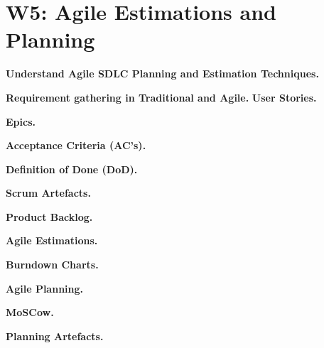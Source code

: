 \section{W5: Agile Estimations and Planning}

\textbf{Understand Agile SDLC Planning and Estimation Techniques.}

\textbf{Requirement gathering in Traditional and Agile.}
    \textbf{User Stories.}

    \textbf{Epics.}

    \textbf{Acceptance Criteria (AC's).}

    \textbf{Definition of Done (DoD).}



\textbf{Scrum Artefacts.}

\textbf{Product Backlog.}

\textbf{Agile Estimations.}

    \textbf{Burndown Charts.}

\textbf{Agile Planning.}

    \textbf{MoSCow.}

    \textbf{Planning Artefacts.}
